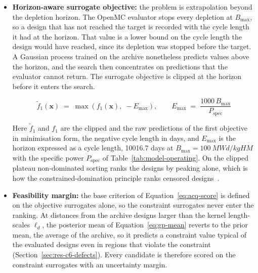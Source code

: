 \begin{itemize}
  \item \textbf{Horizon-aware surrogate objective:} the problem is
        extrapolation beyond the depletion horizon. The OpenMC
        evaluator stops every depletion at $B_\mathrm{max}$, so a
        design that has not reached the target is recorded with the
        cycle length it had at the horizon. That value is a lower bound
        on the cycle length the design would have reached, since its
        depletion was stopped before the target. A Gaussian process
        trained on the archive nonetheless predicts values above the
        horizon, and the search then concentrates on predictions that
        the evaluator cannot return. The surrogate objective is clipped at the horizon
        before it enters the search.

        \begin{equation}
        \tilde{f}_1(\mathbf{x}) \;=\;
        \max\!\left( f_1(\mathbf{x}),\; -E_\mathrm{max} \right),
        \qquad
        E_\mathrm{max} \;=\; \frac{1000\, B_\mathrm{max}}{P_\mathrm{spec}}
        \label{eq:efpd-clip}
        \end{equation}

        Here $\tilde{f}_1$ and $f_1$ are the clipped and the raw
        predictions of the first objective in minimisation form, the
        negative cycle length in days, and $E_\mathrm{max}$ is the
        horizon expressed as a cycle length, \num{10016.7} days at
        $B_\mathrm{max} = \SI{100}{MWd/kgHM}$ with the specific power
        $P_\mathrm{spec}$ of Table~\ref{tab:model-operating}. On the
        clipped plateau non-dominated sorting ranks the designs by
        peaking alone, which is how the constrained-domination principle
        ranks censored designs~\cite{deb_nsga2_2002}.

  \item \textbf{Feasibility margin:} the base criterion of
        Equation~\eqref{eq:acq-score} is defined on the objective
        surrogates alone, so the constraint surrogates never enter the
        ranking. At distances from the archive designs larger than
        the kernel length-scales $\ell_d$, the posterior mean of
        Equation~\eqref{eq:gp-mean} reverts to the prior mean, the
        average of the archive, so it predicts a constraint value
        typical of the evaluated designs even in regions that violate
        the constraint (Section~\ref{sec:res-c6-defects}). Every
        candidate is therefore scored on the
        constraint surrogates with an uncertainty margin.


\end{itemize}
